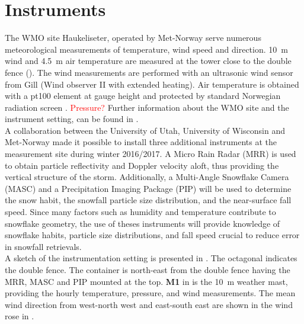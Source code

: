 \section{Instruments} \label{sec:DIM}
The WMO site Haukeliseter, operated by Met-Norway serve numerous meteorological measurements of temperature, wind speed and direction. \SI{10}{\meter} wind and \SI{4.5}{\metre} air temperature are measured at the tower close to the double fence (). The wind measurements are performed with an ultrasonic wind sensor from Gill (Wind observer II with extended heating). Air temperature is obtained with a pt100 element at gauge height and protected by standard Norwegian radiation screen \citep{wolff_derivation_2015}. \textcolor{red}{Pressure? } Further information about the WMO site and the instrument setting, can be found in \citet{wolff_measurements_2013,wolff_derivation_2015}.
\\
A collaboration between the University of Utah, University of Wisconsin and Met-Norway made it possible to install three additional instruments at the measurement site during winter 2016/2017. A Micro Rain Radar (MRR) is used to obtain particle reflectivity and Doppler velocity aloft, thus providing the vertical structure of the storm. 
Additionally, a Multi-Angle Snowflake Camera (MASC) and a Precipitation Imaging Package (PIP) will be used to determine the snow habit, the snowfall particle size distribution, and the near-surface fall speed.  
Since many factors such as humidity and temperature contribute to snowflake geometry, the use of theses instruments will provide knowledge of snowflake habits, particle size distributions, and fall speed crucial to reduce error in snowfall retrievals.
\\

\noindent
A sketch of the instrumentation setting is presented in . The octagonal indicates the double fence. The container is north-east from the double fence having the MRR, MASC and PIP mounted at the top. \textbf{M1} in  is the \SI{10}{\metre} weather mast, providing the hourly \citet{eklima_norwegian_2016} temperature, pressure, and wind measurements. The mean wind direction from west-north west and east-south east are shown in the wind rose in .
%
%
\newpage
